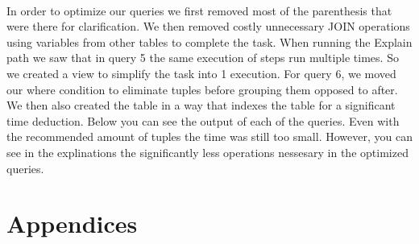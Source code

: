 \documentclass[11pt]{report}
\begin{document}
	\paragraph*{}
		In order to optimize our queries we first removed most of the parenthesis that were there for clarification. We then removed costly unnecessary JOIN operations using variables from other tables to complete the task. When running the Explain path we saw that in query 5 the same execution of steps run multiple times. So we created a view to simplify the task into 1 execution. For query 6, we moved our where condition to eliminate tuples before grouping them opposed to after. We then also created the table in a way that indexes the table for a significant time deduction. Below you can see the output of each of the queries. Even with the recommended amount of tuples the time was still too small. However, you can see in the explinations the significantly less operations nessesary in the optimized queries.

\newpage

\section*{Appendices}
\end{document}
